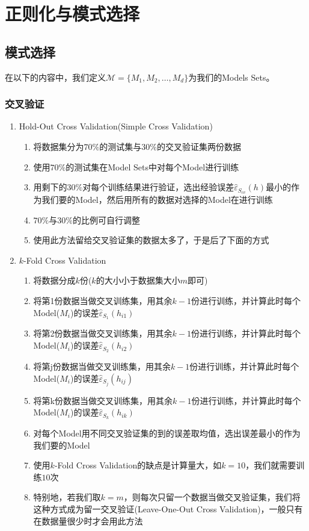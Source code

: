 \section{正则化与模式选择}
\subsection{模式选择}
在以下的内容中，我们定义$\mathcal{M} = \{M_1, M_2, \dots, M_d\}$为我们的Models Sets。

\subsubsection{交叉验证}
\begin{enumerate}
	\item Hold-Out Cross Validation(Simple Cross Validation)
	\begin{enumerate}
		\item 将数据集分为$70\%$的测试集与$30\%$的交叉验证集两份数据
		\item 使用$70\%$的测试集在Model Sets中对每个Model进行训练
		\item 用剩下的$30\%$对每个训练结果进行验证，选出经验误差$\hat{\varepsilon}_{S_{cv}}(h)$最小的作为我们要的Model，然后用所有的数据对选择的Model在进行训练
		\item $70\%$与$30\%$的比例可自行调整
		\item 使用此方法留给交叉验证集的数据太多了，于是后了下面的方式
	\end{enumerate}

	\item $k$-Fold Cross Validation
	\begin{enumerate}
		\item 将数据分成$k$份($k$的大小小于数据集大小$m$即可)
		\item 将第1份数据当做交叉训练集，用其余$k-1$份进行训练，并计算此时每个Model($M_i$)的误差$\hat{\varepsilon}_{S_1}(h_{i1})$
		\item 将第2份数据当做交叉训练集，用其余$k-1$份进行训练，并计算此时每个Model($M_i$)的误差$\hat{\varepsilon}_{S_2}(h_{i2})$
		\item 将第j份数据当做交叉训练集，用其余$k-1$份进行训练，并计算此时每个Model($M_i$)的误差$\hat{\varepsilon}_{S_j}(h_{ij})$
		\item 将第k份数据当做交叉训练集，用其余$k-1$份进行训练，并计算此时每个Model($M_i$)的误差$\hat{\varepsilon}_{S_k}(h_{ik})$
		\item 对每个Model用不同交叉验证集的到的误差取均值，选出误差最小的作为我们要的Model
		\item 使用$k$-Fold Cross Validation的缺点是计算量大，如$k=10$，我们就需要训练$10$次
		\item 特别地，若我们取$k=m$，则每次只留一个数据当做交叉验证集，我们将这种方式成为留一交叉验证(Leave-One-Out Cross Validation)，一般只有在数据量很少时才会用此方法

	\end{enumerate}
\end{enumerate}


